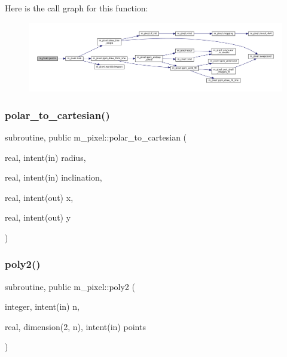 Here is the call graph for this function\+:
\nopagebreak
\begin{figure}[H]
\begin{center}
\leavevmode
\includegraphics[width=350pt]{namespacem__pixel_a11234e0b33104eb0afb24f928b072053_cgraph}
\end{center}
\end{figure}
\mbox{\label{namespacem__pixel_a5ee5c618d117b150b661e15517a3d408}} 
\subsubsection{\texorpdfstring{polar\+\_\+to\+\_\+cartesian()}{polar\_to\_cartesian()}}
{\footnotesize\ttfamily subroutine, public m\+\_\+pixel\+::polar\+\_\+to\+\_\+cartesian (\begin{DoxyParamCaption}\item[{real, intent(in)}]{radius,  }\item[{real, intent(in)}]{inclination,  }\item[{real, intent(out)}]{x,  }\item[{real, intent(out)}]{y }\end{DoxyParamCaption})}

\mbox{\label{namespacem__pixel_a996117d631dce0e92056a0c486be5109}} 
\subsubsection{\texorpdfstring{poly2()}{poly2()}}
{\footnotesize\ttfamily subroutine, public m\+\_\+pixel\+::poly2 (\begin{DoxyParamCaption}\item[{integer, intent(in)}]{n,  }\item[{real, dimension(2, n), intent(in)}]{points }\end{DoxyParamCaption})}



